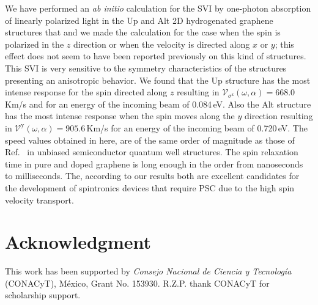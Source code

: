 \documentclass[floatfix,prb,aps,superscriptaddress,showpacs,11pt,preprint,letterpaper]{revtex4}
\begin{document}
We have performed an \emph{ab initio} calculation for the SVI by one-photon
absorption of linearly polarized light in the Up and Alt 2D
hydrogenated graphene structures that and we made the calculation for the case
when the spin is polarized in the $z$ direction or when the velocity is
directed along $x$ or $y$; this effect does not seem to have been reported
previously on this kind of structures. 
% 
This SVI is very sensitive to the symmetry characteristics of the structures
presenting an anisotropic behavior. We found that the Up structure has
the most intense response for the spin directed along $z$ resulting in 
% 
$\mathcal{V}_{\sigma^{\mathrm{z}}} (\omega,\alpha) = 668.0$\,Km/s and 
% 
for an energy of the incoming beam of 0.084\,eV. Also the Alt structure
has the most intense response when the spin moves along the $y$ direction
resulting in 
% 
$\mathcal{V}^{\mathrm{y}} (\omega,\alpha) = 905.6$\,Km/s
% 
for an energy of the incoming beam of 0.720\,eV.
% 
The speed values obtained in here, are of the same order of magnitude
as those of Ref.~ in 
unbiased semiconductor quantum well structures.
The spin relaxation time in pure and doped graphene is long enough in the order
from nanoseconds to milliseconds. \cite{wojtaszekPRB13,ertlerPRB09} The,
according to our results both are excellent candidates for the development of
spintronics devices that require PSC due to the high spin velocity transport.

\section{Acknowledgment} %

This work has been supported by \emph{Consejo Nacional de Ciencia y
Tecnolog\'ia} (CONACyT), M\'exico, Grant No. 153930.
R.Z.P. thank CONACyT for scholarship support.

\end{document}
